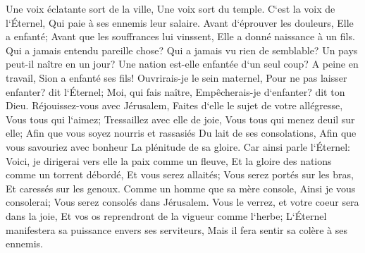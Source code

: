 \verse Une voix éclatante sort de la ville, Une voix sort du temple. C`est la voix de l`Éternel, Qui paie à ses ennemis leur salaire. 
\verse Avant d`éprouver les douleurs, Elle a enfanté; Avant que les souffrances lui vinssent, Elle a donné naissance à un fils. 
\verse Qui a jamais entendu pareille chose? Qui a jamais vu rien de semblable? Un pays peut-il naître en un jour? Une nation est-elle enfantée d`un seul coup? A peine en travail, Sion a enfanté ses fils! 
\verse Ouvrirais-je le sein maternel, Pour ne pas laisser enfanter? dit l`Éternel; Moi, qui fais naître, Empêcherais-je d`enfanter? dit ton Dieu. 
\verse Réjouissez-vous avec Jérusalem, Faites d`elle le sujet de votre allégresse, Vous tous qui l`aimez; Tressaillez avec elle de joie, Vous tous qui menez deuil sur elle; 
\verse Afin que vous soyez nourris et rassasiés Du lait de ses consolations, Afin que vous savouriez avec bonheur La plénitude de sa gloire. 
\verse Car ainsi parle l`Éternel: Voici, je dirigerai vers elle la paix comme un fleuve, Et la gloire des nations comme un torrent débordé, Et vous serez allaités; Vous serez portés sur les bras, Et caressés sur les genoux. 
\verse Comme un homme que sa mère console, Ainsi je vous consolerai; Vous serez consolés dans Jérusalem. 
\verse Vous le verrez, et votre coeur sera dans la joie, Et vos os reprendront de la vigueur comme l`herbe; L`Éternel manifestera sa puissance envers ses serviteurs, Mais il fera sentir sa colère à ses ennemis. 
